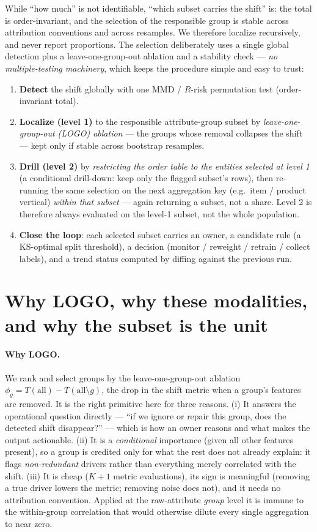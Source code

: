 \documentclass[11pt]{article}
\begin{document}
While ``how much'' is not identifiable, ``which subset carries the shift'' is: the
total is order-invariant, and the selection of the responsible group is stable
across attribution conventions and across resamples. We therefore localize
recursively, and never report proportions. The selection deliberately uses a
single global detection plus a leave-one-group-out ablation and a stability
check --- \emph{no multiple-testing machinery}, which keeps the procedure simple
and easy to trust:

\begin{enumerate}[leftmargin=2em]
\item \textbf{Detect} the shift globally with one MMD / $R$-risk permutation
test (order-invariant total).
\item \textbf{Localize (level 1)} to the responsible attribute-group subset by
\emph{leave-one-group-out (LOGO) ablation} --- the groups whose removal collapses
the shift --- kept only if stable across bootstrap resamples.
\item \textbf{Drill (level 2)} by \emph{restricting the order table to the
entities selected at level 1} (a conditional drill-down: keep only the flagged
subset's rows), then re-running the same selection on the next aggregation key
(e.g.\ item / product vertical) \emph{within that subset} --- again returning a
subset, not a share. Level 2 is therefore always evaluated on the level-1 subset,
not the whole population.
\item \textbf{Close the loop}: each selected subset carries an owner, a candidate
rule (a KS-optimal split threshold), a decision (monitor / reweight / retrain /
collect labels), and a trend status computed by diffing against the previous run.
\end{enumerate}

\section{Why LOGO, why these modalities, and why the subset is the unit}

\paragraph{Why LOGO.} We rank and select groups by the leave-one-group-out
ablation $\phi_g = T(\text{all}) - T(\text{all}\setminus g)$, the drop in the
shift metric when a group's features are removed. It is the right primitive here
for three reasons. (i) It answers the operational question directly --- ``if we
ignore or repair this group, does the detected shift disappear?'' --- which is
how an owner reasons and what makes the output actionable. (ii) It is a
\emph{conditional} importance (given all other features present), so a group is
credited only for what the rest does not already explain: it flags
\emph{non-redundant} drivers rather than everything merely correlated with the
shift. (iii) It is cheap ($K{+}1$ metric evaluations), its sign is meaningful
(removing a true driver lowers the metric; removing noise does not), and it needs
no attribution convention. Applied at the raw-attribute \emph{group} level it is
immune to the within-group correlation that would otherwise dilute every single
aggregation to near zero.
\end{document}
